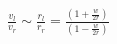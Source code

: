 \documentclass[preview]{standalone}
\begin{document}
\begin{center}
$\frac{v_{l} } {v_{r} }\sim \frac{r_{l}}{ {r_{r} } } =$$\frac{ (1+\frac{w}{2r})}{ (1-\frac{w}{2r})}$
\end{center}
\end{document}
